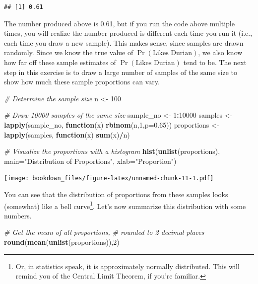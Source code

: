 \documentclass[openany]{book}
\newenvironment{Shaded}{\begin{snugshade}}{\end{snugshade}}
\newcommand{\KeywordTok}[1]{\textcolor[rgb]{0.13,0.29,0.53}{\textbf{#1}}}
\newcommand{\DataTypeTok}[1]{\textcolor[rgb]{0.13,0.29,0.53}{#1}}
\newcommand{\DecValTok}[1]{\textcolor[rgb]{0.00,0.00,0.81}{#1}}
\newcommand{\FloatTok}[1]{\textcolor[rgb]{0.00,0.00,0.81}{#1}}
\newcommand{\StringTok}[1]{\textcolor[rgb]{0.31,0.60,0.02}{#1}}
\newcommand{\CommentTok}[1]{\textcolor[rgb]{0.56,0.35,0.01}{\textit{#1}}}
\newcommand{\ControlFlowTok}[1]{\textcolor[rgb]{0.13,0.29,0.53}{\textbf{#1}}}
\newcommand{\OperatorTok}[1]{\textcolor[rgb]{0.81,0.36,0.00}{\textbf{#1}}}
\newcommand{\NormalTok}[1]{#1}
\let\rmarkdownfootnote\footnote%
\def\footnote{\protect\rmarkdownfootnote}
\begin{document}
\begin{verbatim}
## [1] 0.61
\end{verbatim}

The number produced above is 0.61, but if you run the code above
multiple times, you will realize the number produced is different each
time you run it (i.e., each time you draw a new sample). This makes
sense, since samples are drawn randomly. Since we know the true value of
\(\Pr(\text{Likes Durian})\), we also know how far off these sample
estimates of \(\Pr(\text{Likes Durian})\) tend to be. The next step in
this exercise is to draw a large number of samples of the same size to
show how much these sample proportions can vary.

\begin{Shaded}
\begin{Highlighting}[]
\CommentTok{# Determine the sample size}
\NormalTok{n <-}\StringTok{ }\DecValTok{100}

\CommentTok{# Draw 10000 samples of the same size}
\NormalTok{sample_no <-}\StringTok{ }\DecValTok{1}\OperatorTok{:}\DecValTok{10000}
\NormalTok{samples <-}\StringTok{ }\KeywordTok{lapply}\NormalTok{(sample_no, }\ControlFlowTok{function}\NormalTok{(x) }\KeywordTok{rbinom}\NormalTok{(n,}\DecValTok{1}\NormalTok{,}\DataTypeTok{p=}\FloatTok{0.65}\NormalTok{))}
\NormalTok{proportions <-}\StringTok{ }\KeywordTok{lapply}\NormalTok{(samples, }\ControlFlowTok{function}\NormalTok{(x) }\KeywordTok{sum}\NormalTok{(x)}\OperatorTok{/}\NormalTok{n)}

\CommentTok{# Visualize the proportions with a histogram}
\KeywordTok{hist}\NormalTok{(}\KeywordTok{unlist}\NormalTok{(proportions), }
     \DataTypeTok{main=}\StringTok{"Distribution of Proportions"}\NormalTok{, }
     \DataTypeTok{xlab=}\StringTok{"Proportion"}\NormalTok{)}
\end{Highlighting}
\end{Shaded}

\texttt{[image: bookdown\_files/figure-latex/unnamed-chunk-11-1.pdf]}

You can see that the distribution of proportions from these samples
looks (somewhat) like a bell curve\footnote{Or, in statistics speak, it
  is approximately normally distributed. This will remind you of the
  Central Limit Theorem, if you're familiar.}. Let's now summarize this
distribution with some numbers.

\begin{Shaded}
\begin{Highlighting}[]
\CommentTok{# Get the mean of all proportions, }
\CommentTok{#  rounded to 2 decimal places}
\KeywordTok{round}\NormalTok{(}\KeywordTok{mean}\NormalTok{(}\KeywordTok{unlist}\NormalTok{(proportions)),}\DecValTok{2}\NormalTok{)}
\end{Highlighting}
\end{Shaded}
\end{document}
